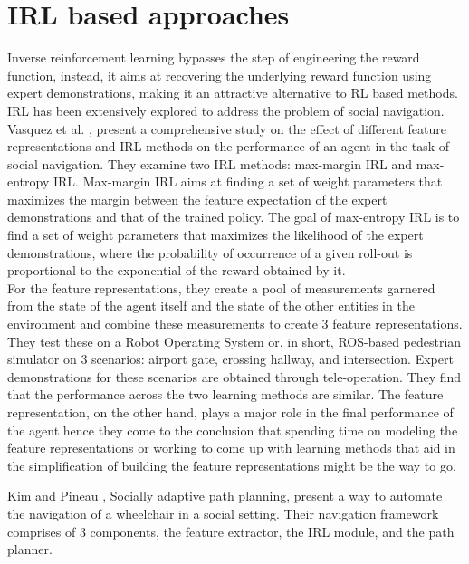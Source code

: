 \section{IRL based approaches}
Inverse reinforcement learning bypasses the step of engineering the reward function, instead, it aims at recovering the underlying reward function using expert demonstrations, making it an attractive alternative to RL based methods. IRL has been extensively explored to address the problem of social navigation. \\
Vasquez et al. \cite{vasquez_inverse_2014}, present a comprehensive study on the effect of different feature representations and IRL methods on the performance of an agent in the task of social navigation. They examine two IRL methods: max-margin IRL and max-entropy IRL. Max-margin IRL aims at finding a set of weight parameters that maximizes the margin between the feature expectation of the expert demonstrations and that of the trained policy. The goal of max-entropy IRL is to find a set of weight parameters that maximizes the likelihood of the expert demonstrations, where the probability of occurrence of a given roll-out is proportional to the exponential of the reward obtained by it. \\
For the feature representations, they create a pool of measurements garnered from the state of the agent itself and the state of the other entities in the environment and combine these measurements to create 3 feature representations. \\
They test these on a Robot Operating System or, in short, ROS-based pedestrian simulator on 3 scenarios: airport gate, crossing hallway, and intersection. Expert demonstrations for these scenarios are obtained through tele-operation. They find that the performance across the two learning methods are similar. The feature representation, on the other hand, plays a major role in the final performance of the agent hence they come to the conclusion that spending time on modeling the feature representations or working to come up with learning methods that aid in the simplification of building the feature representations might be the way to go.
\\
\par
Kim and Pineau \cite{kim_socially_2016}, Socially adaptive path planning, present a way to automate the navigation of a wheelchair in a social setting. Their navigation framework comprises of 3 components, the feature extractor, the IRL module, and the path planner.\\
